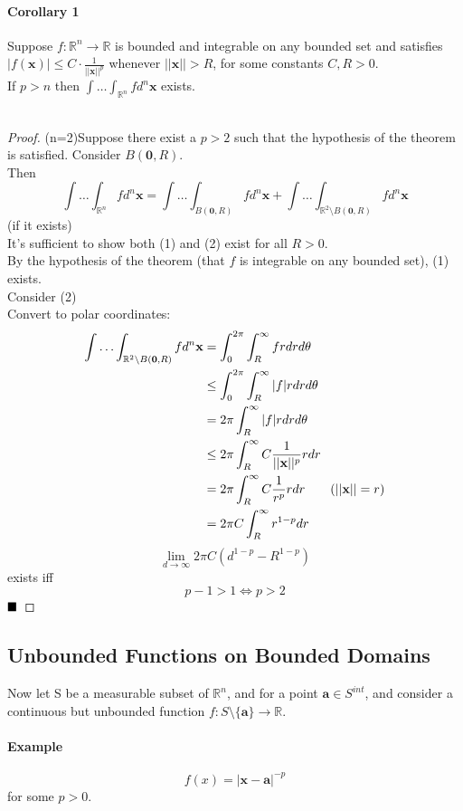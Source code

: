 \documentclass[11pt]{article}
\newcommand{\tb}[1]{\textbf{#1}}
\newcommand{\real}[0]{\mathbb{R}}
\newcommand{\vx}[0]{\tb{x}}
\newcommand{\vo}[0]{\tb{0}}
\newcommand{\va}[0]{\tb{a}}
\newcommand{\qed}[0]{$\hfill\blacksquare$}
\begin{document}
\paragraph{Corollary 1} Suppose $f:\real^n \rightarrow \real$ is bounded and integrable on any bounded set and satisfies $|f(\vx)| \leq C \cdot \frac{1}{||\vx||^p}$ whenever $||\vx|| > R$, for some constants $C,R > 0$.\\
If $p>n$ then $\int\hdots \int_{\real^n}fd^n\vx$ exists.\\\\
\begin{proof}
(n=2)Suppose there exist a $p > 2$ such that the hypothesis of the theorem is satisfied. Consider $B(\vo,R)$.\\
Then $$\int\hdots \int_{\real^n}fd^n\vx = \int\hdots \int_{B(\vo,R)}fd^n\vx + \int\hdots \int_{\real^2 \setminus B(\vo, R)}fd^n\vx$$
(if it exists)\\
It's sufficient to show both (1) and (2) exist for all $R>0$.\\
By the hypothesis of the theorem (that $f$ is integrable on any bounded set), (1) exists.\\
Consider (2)\\
Convert to polar coordinates:
\begin{align*}
	\int\hdots \int_{\real^2 \setminus B(\vo, R)}fd^n\vx &= \int_0^{2\pi}\int_R^\infty frdrd\theta\\
	&\leq \int_0^{2\pi}\int_R^\infty|f|rdrd\theta\\
	&= 2\pi \int_R^\infty|f|rdrd\theta\\
	&\leq 2\pi \int_R^\infty C \frac{1}{||\vx||^p}rdr\\
	&= 2\pi \int_R^\infty C \frac{1}{r^p}rdr \tag{$||\vx|| = r$}\\
	&= 2\pi C\int_R^\infty r^{1-p}dr\\
\end{align*}
$$\underset{d\rightarrow\infty}{\lim}2\pi C(d^{1-p}-R^{1-p})$$ exists iff $$ p - 1> 1 \iff p>2$$ \qed
\end{proof}

\subsection{Unbounded Functions on Bounded Domains}
Now let S be a measurable subset of $\real^n$, and for a point $\tb{a} \in S^{int}$, and consider a continuous but unbounded function $f: S\setminus\{\va\} \rightarrow \real$.\\
\paragraph{Example} $$f(x) = |\vx - \va|^{-p}$$ for some $p>0$.
\end{document}

